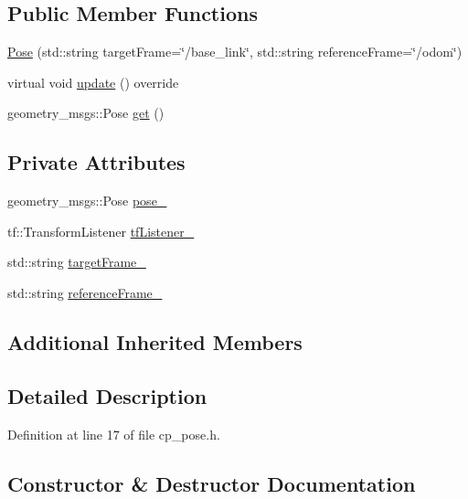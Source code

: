 \subsection*{Public Member Functions}
\begin{DoxyCompactItemize}
\item 
\hyperlink{classmove__base__z__client_1_1Pose_a250b93daff3628f0fe255c31f4f95d15}{Pose} (std\+::string target\+Frame=\char`\"{}/base\+\_\+link\char`\"{}, std\+::string reference\+Frame=\char`\"{}/odom\char`\"{})
\item 
virtual void \hyperlink{classmove__base__z__client_1_1Pose_ad094a81813138d975632a2ae492c51f8}{update} () override
\item 
geometry\+\_\+msgs\+::\+Pose \hyperlink{classmove__base__z__client_1_1Pose_aff06e2c3d38159f35829fb9285a110b6}{get} ()
\end{DoxyCompactItemize}
\subsection*{Private Attributes}
\begin{DoxyCompactItemize}
\item 
geometry\+\_\+msgs\+::\+Pose \hyperlink{classmove__base__z__client_1_1Pose_a81995c2933c1ad72b19b31b89179e6a4}{pose\+\_\+}
\item 
tf\+::\+Transform\+Listener \hyperlink{classmove__base__z__client_1_1Pose_ac932048a4bb8e389642c290b2c8dcefc}{tf\+Listener\+\_\+}
\item 
std\+::string \hyperlink{classmove__base__z__client_1_1Pose_a268cfb00a32306e9f8ec80479addda9e}{target\+Frame\+\_\+}
\item 
std\+::string \hyperlink{classmove__base__z__client_1_1Pose_a38e1a906cb238d648e46bf7e8fa72fd8}{reference\+Frame\+\_\+}
\end{DoxyCompactItemize}
\subsection*{Additional Inherited Members}


\subsection{Detailed Description}


Definition at line 17 of file cp\+\_\+pose.\+h.



\subsection{Constructor \& Destructor Documentation}
\mbox{\label{classmove__base__z__client_1_1Pose_a250b93daff3628f0fe255c31f4f95d15}} 
